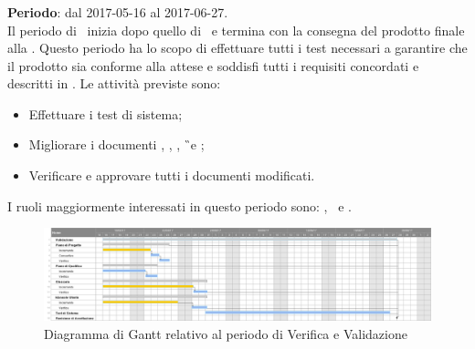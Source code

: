 		\subsubsection{\VV}
		\textbf{Periodo}: dal 2017-05-16 al 2017-06-27.\\
		Il periodo di \VV\ inizia dopo quello di \CO\ e termina con la consegna del prodotto finale alla \RA. Questo periodo ha lo scopo di effettuare tutti i test necessari a garantire che il prodotto sia conforme alla attese e soddisfi tutti i requisiti concordati e descritti in \AdR. Le attività previste sono:
		\begin{itemize}
			\item Effettuare i test di sistema;
			\item Migliorare i documenti \NdP, \PdP, \PdQ, \G\ e \MU;
			\item Verificare e approvare tutti i documenti modificati.
		\end{itemize}
			I ruoli maggiormente interessati in questo periodo sono: \textit{\Res}, \textit{\Prog}\ e \textit{\Ver}.
			
		\begin{figure}[H]
			\centering
			\includegraphics[scale=0.34]{img/ganttnetbreak6.png}
			\caption{Diagramma di Gantt relativo al periodo di Verifica e Validazione}
		\end{figure}
